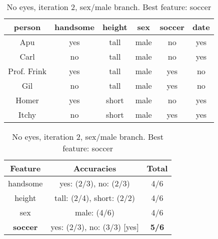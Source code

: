 \begin{table}[h!]
  \centering
  \begin{tabular}{ccccc|c}
    \toprule
    person      & handsome & height & sex    & soccer & date\\
    \midrule
    Apu         & yes      & tall   & male   & no     & yes \\
    Carl        & no       & tall   & male   & no     & yes \\
    Prof. Frink & yes      & tall   & male   & yes    & no  \\
    Gil         & no       & tall   & male   & yes    & no  \\
    Homer       & yes      & short  & male   & no     & yes \\
    Itchy       & no       & short  & male   & yes    & yes \\
    \bottomrule
  \end{tabular}

  \vspace{.5cm}

  \begin{tabular}{ccc}
    \toprule
    Feature         & Accuracies                              & Total\\
    \midrule
    handsome        & yes: (2/3), no: (2/3)                   & 4/6\\
    height          & tall: (2/4), short: (2/2)               & 4/6\\
    sex             & male: (4/6)                             & 4/6\\
    \textbf{soccer} & yes: (2/3), no: (3/3) [yes]             & \textbf{5/6}\\
    \bottomrule
  \end{tabular}
  \caption*{No eyes, iteration 2, sex/male branch. Best feature: soccer}
\end{table}

